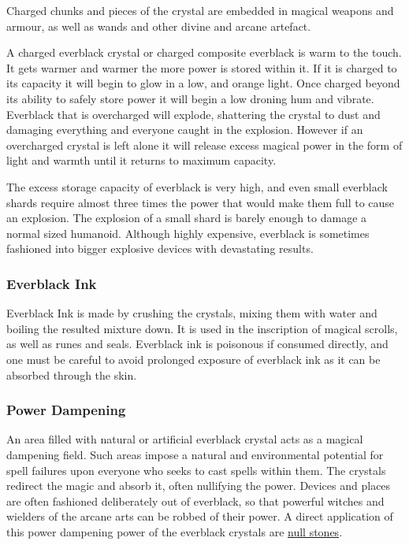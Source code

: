 Charged chunks and pieces of the crystal are embedded in magical weapons and
armour, as well as wands and other divine and arcane artefact.

A charged everblack crystal or charged composite everblack is warm to the touch.
It gets warmer and warmer the more power is stored within it. If it is charged
to its capacity it will begin to glow in a low, and orange light. Once charged
beyond its ability to safely store power it will begin a low droning hum and
vibrate. Everblack that is overcharged will explode, shattering the crystal to
dust and damaging everything and everyone caught in the explosion. However if
an overcharged crystal is left alone it will release excess magical power in
the form of light and warmth until it returns to maximum capacity.

The excess storage capacity of everblack is very high, and even small
everblack shards require almost three times the power that would make them
full to cause an explosion. The explosion of a small shard is barely enough to
damage a normal sized humanoid. Although highly expensive, everblack is
sometimes fashioned into bigger explosive devices with devastating results.


\subsubsection{Everblack Ink}

Everblack Ink is made by crushing the crystals, mixing them with water and
boiling the resulted mixture down. It is used in the inscription of magical
scrolls, as well as runes and seals. Everblack ink is poisonous if consumed
directly, and one must be careful to avoid prolonged exposure of everblack
ink as it can be absorbed through the skin.

\subsubsection{Power Dampening}

An area filled with natural or artificial everblack crystal acts as a magical
dampening field. Such areas impose a natural and environmental potential for
spell failures upon everyone who seeks to cast spells within them. The
crystals redirect the magic and absorb it, often nullifying the power.
Devices and places are often fashioned deliberately out of everblack, so that
powerful witches and wielders of the arcane arts can be robbed of their power.
A direct application of this power dampening power of the everblack crystals
are \hyperref[sec:Null Stone]{null stones}.

